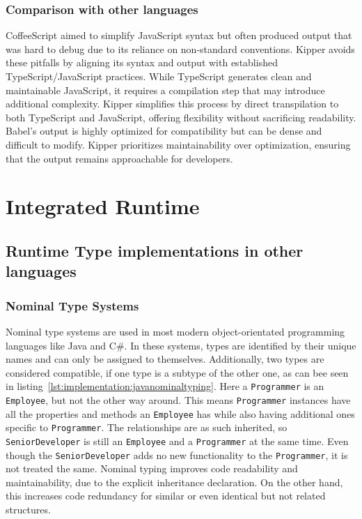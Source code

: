 \subsubsection{Comparison with other languages}

CoffeeScript aimed to simplify JavaScript syntax but often produced output that was hard to debug due to its reliance on non-standard conventions. Kipper avoids these pitfalls by aligning its syntax and output with established TypeScript/JavaScript practices. While TypeScript generates clean and maintainable JavaScript, it requires a compilation step that may introduce additional complexity. Kipper simplifies this process by direct \gls{transpilation} to both TypeScript and JavaScript, offering flexibility without sacrificing readability. Babel's output is highly optimized for compatibility but can be dense and difficult to modify. Kipper prioritizes maintainability over optimization, ensuring that the output remains approachable for developers.

\section{Integrated Runtime}
\label{sec:integrated-runtime}

\subsection{Runtime Type implementations in other languages}
\label{chap:runtime-other-languages}

\subsubsection{Nominal Type Systems}

Nominal type systems are used in most modern object-orientated programming languages like Java and C\#. In these systems, types are identified by their unique names and can only be assigned to themselves. Additionally, two types are considered compatible, if one type is a subtype of the other one, as can bee seen in listing~\ref{lst:implementation:javanominaltyping}. Here a  \lstinline|Programmer| is an \lstinline|Employee|, but not the other way around. This means \lstinline|Programmer| instances have all the properties and methods an \lstinline|Employee| has while also having additional ones specific to \lstinline|Programmer|. The relationships are as such inherited, so \lstinline|SeniorDeveloper| is still an \lstinline|Employee| and a \lstinline|Programmer| at the same time. Even though the \lstinline|SeniorDeveloper| adds no new functionality to the \lstinline|Programmer|, it is not treated the same. Nominal typing improves code readability and maintainability, due to the explicit inheritance declaration. On the other hand, this increases code redundancy for similar or even identical but not related structures.

